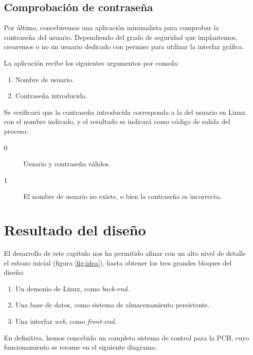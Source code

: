 \smallskip

\subsection{Comprobación de contraseña}
\label{subsec:applogin}

Por último, concebiremos una aplicación minimalista para comprobar la contraseña del usuario. Dependiendo del grado de seguridad que implantemos, crearemos o no un usuario dedicado con permiso para utilizar la interfaz gráfica.

La aplicación recibe los siguientes argumentos por consola:

\begin{enumerate}
	\item Nombre de usuario.
	\item Contraseña introducida.
\end{enumerate}

Se verificará que la contraseña introducida corresponda a la del usuario en Linux con el nombre indicado, y el resultado se indicará como código de salida del proceso:

\begin{description}
	\item[0] Usuario y contraseña válidos.
	\item[1] El nombre de usuario no existe, o bien la contraseña es incorrecta.
\end{description}

\section{Resultado del diseño}

El desarrollo de este capítulo nos ha permitido afinar con un alto nivel de detalle el esbozo inicial (figura \ref{fig:idea}), hasta obtener los tres grandes bloques del diseño:

\begin{enumerate}
	\item Un demonio de Linux, como \textit{back-end}.
	\item Una base de datos, como sistema de almacenamiento persistente.
	\item Una interfaz \textit{web}, como \textit{front-end}.
\end{enumerate}

En definitiva, hemos concebido un completo sistema de control para la \acrshort{PCB}, cuyo funcionamiento se resume en el siguiente diagrama:

